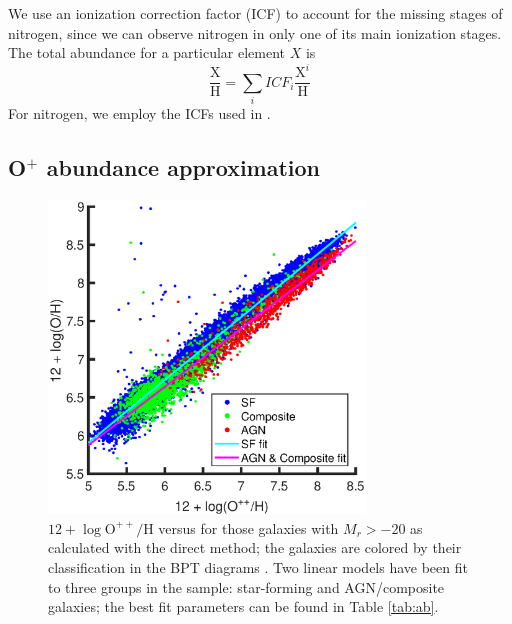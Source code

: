 We use an ionization correction factor (ICF) to account for the missing stages 
of nitrogen, since we can observe nitrogen in only one of its main ionization 
stages.  The total abundance for a particular element $X$ is 
\begin{equation}
    \frac{\text{X}}{\text{H}} = \sum_i ICF_i \frac{\text{X}^i}{\text{H}}
\end{equation}
For nitrogen, we employ the ICFs used in \cite{Douglass17b}.


\subsection{O$^+$ abundance approximation}\label{sec:Oplus_approx}

\begin{figure}
    \centering
    \includegraphics[width=0.75\textwidth]{Images/Paper3/Zlow_v_Zreal_1sig_I06_BPTclass_fits}
    \caption[O$^++$/H versus O/H]{$12 + \log{\text{O}^{++}/\text{H}}$ versus \OH 
    for those galaxies with $M_r > -20$ as calculated with the direct method; 
    the galaxies are colored by their classification in the BPT diagrams 
    \citep[from][]{Brinchmann04}.  Two linear models have been fit to three 
    groups in the sample: star-forming and AGN/composite galaxies; the best fit 
    parameters can be found in Table \ref{tab:ab}.}
    \label{fig:lowVreal}
\end{figure}

